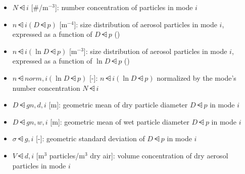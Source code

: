 \begin{itemize}

  \item $N\dsub{i}$ [\#/m$^{-3}$]: number concentration of particles in mode $i$

  \item $n\dsub{i} (D\dsub{p})$ [m$^{-4}$]: size distribution of aerosol
        particles in mode $i$, expressed as a function of $D\dsub{p}$
        ()

  \item $n\dsub{i} (\ln D\dsub{p})$ [m$^{-3}$]: size distribution of aerosol
        particles in mode $i$, expressed as a function of $\ln D\dsub{p}$
        ()

  \item $n\dsub{norm,i} (\ln D\dsub{p})$ [-]: $n\dsub{i} (\ln D\dsub{p})$
        normalized by the mode's number concentration $N\dsub{i}$

  \item $D\dsub{gn,d,i}$ [m]: geometric mean of dry particle diameter
        $D\dsub{p}$ in mode $i$

  \item $D\dsub{gn,w,i}$ [m]: geometric mean of wet particle diameter
        $D\dsub{p}$ in mode $i$

  \item $\sigma\dsub{g,i}$ [-]: geometric standard deviation of $D\dsub{p}$ in
        mode $i$

  \item $V\dsub{d,i}$ [m$^3$ particles/m$^3$ dry air]: volume concentration of
        dry aerosol particles in mode $i$


\end{itemize}
